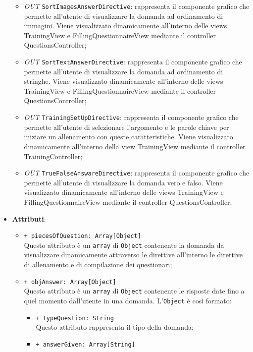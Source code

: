 \begin{itemize}
\begin{itemize}
		\item \textit{OUT} \texttt{SortImagesAnswerDirective}: rappresenta il componente grafico che permette all'utente di visualizzare la domanda ad ordinamento di immagini. Viene visualizzato dinamicamente all'interno delle views TrainingView e FillingQuestionnaireView mediante il controller QuestionsController;
		\item \textit{OUT} \texttt{SortTextAnswerDirective}: rappresenta il componente grafico che permette all'utente di visualizzare la domanda ad ordinamento di stringhe. Viene visualizzato dinamicamente all'interno delle views TrainingView e FillingQuestionnaireView mediante il controller QuestionsController;
		\item \textit{OUT} \texttt{TrainingSetUpDirective}: rappresenta il componente grafico che permette all'utente di selezionare l'argomento e le parole chiave per iniziare un allenamento con queste caratteristiche. Viene visualizzato dinamicamente all'interno della view TrainingView mediante il controller TrainingController;
		\item \textit{OUT} \texttt{TrueFalseAnswareDirective}: rappresenta il componente grafico che permette all'utente di visualizzare la domanda vero e falso. Viene visualizzato dinamicamente all'interno delle views TrainingView e FillingQuestionnaireView mediante il controller QuestionsController;					
	\end{itemize}
	\item \textbf{Attributi}: 
	\begin{itemize}
		\item \texttt{+ piecesOfQuestion: Array[Object]} \\
		Questo attributo è un \texttt{array} di \texttt{Object} contenente la domanda da visualizzare dinamicamente attraverso le direttive all'interno le direttive di allenamento e di compilazione dei questionari;
		\item \texttt{+ objAnswer: Array[Object]} \\
		Questo attributo è un \texttt{array} di \texttt{Object} contenente le risposte date fino a quel momento dall'utente in una domanda. L'\texttt{Object} è così formato: \\
		\begin{itemize}
			\item \texttt{+ typeQuestion: String} \\
			Questo attributo rappresenta il tipo della domanda;
			\item \texttt{+ answerGiven: Array[String]} \\

\end{itemize}
\end{itemize}
\end{itemize}
